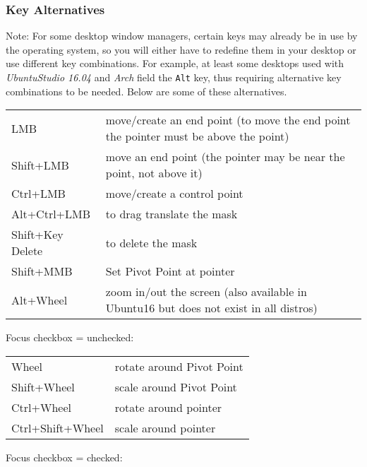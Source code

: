 \subsubsection*{Key Alternatives}%
\label{ssub:key_alternatives}

\vspace{2ex} Note: For some desktop window managers, certain keys may already be in use by the operating system, so you will either have to redefine them in your desktop or use different key combinations.  For example, at least some desktops used with \textit{UbuntuStudio 16.04} and \textit{Arch} field the \texttt{Alt} key, thus requiring alternative key combinations to be needed.  Below are some of these alternatives.

\vspace{2ex}
\begin{tabular}{lp{11cm}}
    \hline			
    LMB & move/create an end point (to move the end point the pointer must be above the point) \\
    Shift+LMB & move an end point (the pointer may be near the point, not above it) \\
    Ctrl+LMB & move/create a control point \\
    Alt+Ctrl+LMB & to drag translate the mask \\
    Shift+Key Delete & to delete the mask \\
    Shift+MMB & Set Pivot Point at pointer \\
    Alt+Wheel & zoom in/out the screen (also available in Ubuntu16 but does not exist in all distros) \\
    \hline  
\end{tabular}

\vspace{2ex}
Focus checkbox = unchecked:

\vspace{2ex}
\begin{tabular}{ll}
    \hline			
    Wheel & rotate around Pivot Point \\
    Shift+Wheel & scale around Pivot Point \\
    Ctrl+Wheel & rotate around pointer \\
    Ctrl+Shift+Wheel & scale around pointer \\
    
    \hline  
\end{tabular}

\vspace{2ex}
Focus checkbox = checked:

